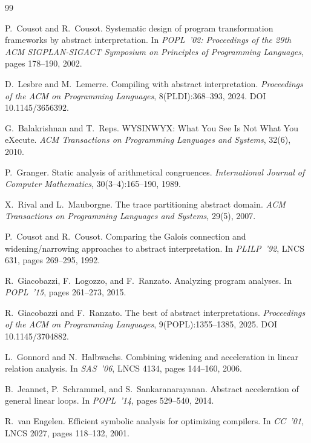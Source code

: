 \documentclass[11pt,a4paper]{article}
\begin{document}
\begin{thebibliography}{99}

P.~Cousot and R.~Cousot.
\newblock Systematic design of program transformation frameworks by abstract
  interpretation.
\newblock In \emph{POPL~'02: Proceedings of the 29th ACM SIGPLAN-SIGACT Symposium on
  Principles of Programming Languages}, pages 178--190, 2002.

D.~Lesbre and M.~Lemerre.
\newblock Compiling with abstract interpretation.
\newblock \emph{Proceedings of the ACM on Programming Languages}, 8(PLDI):368--393, 2024.
\newblock DOI 10.1145/3656392.

G.~Balakrishnan and T.~Reps.
\newblock WYSINWYX: What You See Is Not What You eXecute.
\newblock \emph{ACM Transactions on Programming Languages and Systems}, 32(6), 2010.

P.~Granger.
\newblock Static analysis of arithmetical congruences.
\newblock \emph{International Journal of Computer Mathematics}, 30(3--4):165--190, 1989.

X.~Rival and L.~Mauborgne.
\newblock The trace partitioning abstract domain.
\newblock \emph{ACM Transactions on Programming Languages and Systems}, 29(5), 2007.

P.~Cousot and R.~Cousot.
\newblock Comparing the {G}alois connection and widening/narrowing approaches to abstract
  interpretation.
\newblock In \emph{PLILP~'92}, LNCS 631, pages 269--295, 1992.

R.~Giacobazzi, F.~Logozzo, and F.~Ranzato.
\newblock Analyzing program analyses.
\newblock In \emph{POPL~'15}, pages 261--273, 2015.

R.~Giacobazzi and F.~Ranzato.
\newblock The best of abstract interpretations.
\newblock \emph{Proceedings of the ACM on Programming Languages}, 9(POPL):1355--1385,
  2025.
\newblock DOI 10.1145/3704882.

L.~Gonnord and N.~Halbwachs.
\newblock Combining widening and acceleration in linear relation analysis.
\newblock In \emph{SAS~'06}, LNCS 4134, pages 144--160, 2006.

B.~Jeannet, P.~Schrammel, and S.~Sankaranarayanan.
\newblock Abstract acceleration of general linear loops.
\newblock In \emph{POPL~'14}, pages 529--540, 2014.

R.~van Engelen.
\newblock Efficient symbolic analysis for optimizing compilers.
\newblock In \emph{CC~'01}, LNCS 2027, pages 118--132, 2001.

\end{thebibliography}
\end{document}

